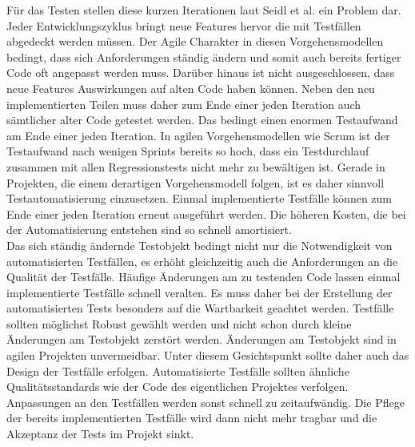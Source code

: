 Für das Testen stellen diese kurzen Iterationen laut  Seidl et al. \cite[vgl. S.24]{seidl_basiswissen_2012} ein Problem dar.
Jeder Entwicklungszyklus bringt neue Features hervor die mit Testfällen abgedeckt werden müssen. Der Agile Charakter in diesen Vorgehensmodellen bedingt, dass sich Anforderungen ständig ändern und somit auch bereits fertiger Code oft angepasst werden muss. Darüber hinaus ist nicht ausgeschlossen, dass neue Features Auswirkungen auf alten Code haben können. Neben den neu implementierten Teilen muss daher zum Ende einer jeden Iteration auch sämtlicher alter Code getestet werden.
Das bedingt einen enormen Testaufwand am Ende einer jeden Iteration. 
In agilen Vorgehensmodellen wie Scrum ist der Testaufwand nach wenigen Sprints bereits so hoch, dass ein Testdurchlauf zusammen mit allen Regressionstests nicht mehr zu bewältigen ist.
Gerade in Projekten, die einem derartigen Vorgehensmodell folgen, ist es daher sinnvoll Testautomatisierung einzusetzen. Einmal implementierte Testfälle können zum Ende einer jeden Iteration erneut ausgeführt werden. Die höheren Kosten, die bei der Automatisierung entstehen sind so schnell amortisiert.\\
Das sich ständig ändernde Testobjekt bedingt nicht nur die Notwendigkeit von automatisierten Testfällen, es erhöht gleichzeitig auch die Anforderungen an die Qualität der Testfälle. Häufige Änderungen am zu testenden Code lassen einmal implementierte Testfälle schnell veralten. Es muss daher bei der Erstellung der automatisierten Tests besonders auf die Wartbarkeit geachtet werden. Testfälle sollten möglichst Robust gewählt werden und nicht schon durch kleine Änderungen am Testobjekt zerstört werden. Änderungen am Testobjekt sind in agilen Projekten unvermeidbar. Unter diesem Gesichtspunkt sollte daher auch das Design der Testfälle erfolgen. Automatisierte Testfälle sollten ähnliche Qualitätsstandards wie der Code des eigentlichen Projektes verfolgen. Anpassungen an den Testfällen werden sonst schnell zu zeitaufwändig. Die Pflege der bereits implementierten Testfälle wird dann nicht mehr tragbar und die Akzeptanz der Tests im Projekt sinkt.
